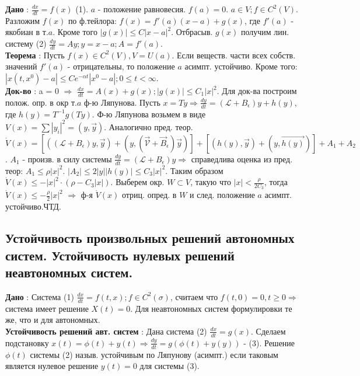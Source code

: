 \documentclass[unicode, 8pt, a4paper,oneside, landscape]{article}
\begin{document}
\begin{multicols}{4}
{\bf Дано} : $\frac{dx}{dt} = f(x)$ (1). $a$ - положение равновесия. $f(a) = 0$. $a \in V; f \in C^2(V)$. Разложим $f(x)$ по ф.тейлора: $f(x) = f'(a)(x-a) + g(x)$, где $f'(a)$ - якобиан в т.$a$. Кроме того $|g(x)| \leq C|x-a|^2$. Отбрасыв. $g(x)$ получим лин. систему (2) $\frac{dy}{dt} = Ay; y= x-a; A = f'(a)$.\\
{\bf Теорема} : Пусть $f(x) \in C^2(V), V = U(a)$. Если веществ. части всех собств. значений $f'(a)$ - отрицательны, то положение $a$ асимпт. устойчиво. Кроме того: $|x(t, x^0) - a| \leq Ce^{-\alpha t}|x^0 - a|; 0 \leq t < \infty$.\\
{\bf Док-во} : a = 0 $\Rightarrow$ $\frac{dx}{dt} = A(x) + g(x); |g(x)| \leq C_1|x|^2$. Для док-ва построим полож. опр. в окр т.$a$ ф-ю Ляпунова. Пусть $x = Ty \Rightarrow \frac{dy}{dt} = (\mathcal{L} + B_\epsilon)y + h(y)$, где $h(y) = T^{-1}g(Ty)$. Ф-ю Ляпунова возьмем в виде $V(x) = \sum|y_i|^2 = (y, \vec{y})$. Аналогично пред. теор. $\dot{V}(x) = [((\mathcal{L} + B_\epsilon)y, \vec{y}) + (y, (\vec{\mathcal{V}} + \vec{B}_\epsilon)\vec{y})] + [(h(y), \vec{y}) + (y, \vec{h(y)})] + A_1 + A_2$. $A_1$  - произв. в силу системы $\frac{dy}{dt} = (\mathcal{L} + B_\epsilon)y \Rightarrow$ справедлива оценка из пред. теор: $A_1 \leq \rho|x|^2$. $|A_2| \leq 2|y||h(y)| \leq C_3|x|^2$. Таким образом $\dot{V}(x) \leq -|x|^2\cdot(\rho - C_3|x|)$. Выберем окр. $W \subset V$, такую что $|x| < \frac{\rho}{2C_3}$, тогда $\dot{V}(x) \leq -\frac{\rho}{2}|x|^2$ $\Rightarrow$ ф-я $\dot{V}(x)$ отриц. опред. в $W$ и след. положение $a$ асимпт. устойчиво.ЧТД.


\subsection{Устойчивость произвольных решений автономных систем. Устойчивость нулевых решений неавтономных систем.}

{\bf Дано} :  Система (1) $\frac{dx}{dt} = f(t, x); f \in C^2(\sigma)$, считаем что $f(t, 0) = 0, t \geq 0 \Rightarrow$ система имеет решение $X(t) = 0$. Для неавтономных систем формулировки те же, что и для автономных.\\
{\bf Устойчивость решений авт. систем} : Дана система (2) $\frac{dx}{dt} = g(x)$. Сделаем подстановку $x(t) = \phi(t) + y(t) \Rightarrow \frac{dy}{dt} = g(\phi(t) + y(y))$ - (3). Решение $\phi(t)$ системы (2) назыв. устойчивым по Ляпунову (асимпт.) если таковым является нулевое решение $y(t) = 0$ для системы (3).


\end{multicols}
\end{document}

